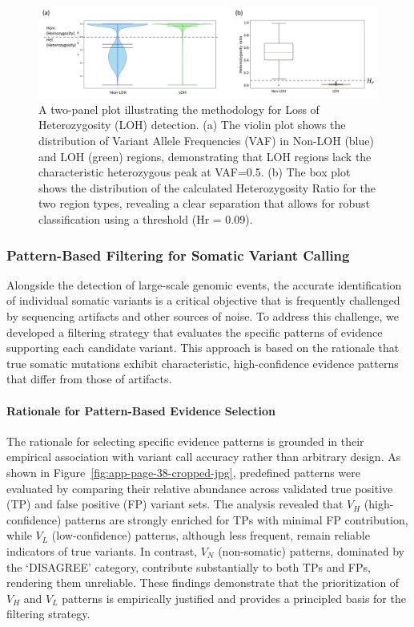 \documentclass[pdflatex,sn-nature]{sn-jnl}
\def\pandocbounded#1{%
  \begingroup
  \setkeys{Gin}{width=1.0\linewidth,height=1.0\textheight,keepaspectratio}%
  #1%
  \endgroup
}
\begin{document}
\begin{figure}
\centering
\pandocbounded{\includegraphics[keepaspectratio]{page_37_cropped.jpg}}
\caption[LOH Detection Methodology]{A two-panel plot illustrating the methodology for Loss of Heterozygosity (LOH) detection. (a) The violin plot shows the distribution of Variant Allele Frequencies (VAF) in Non-LOH (blue) and LOH (green) regions, demonstrating that LOH regions lack the characteristic heterozygous peak at VAF=0.5. (b) The box plot shows the distribution of the calculated Heterozygosity Ratio for the two region types, revealing a clear separation that allows for robust classification using a threshold (Hr = 0.09).}\label{fig:app-page-37-cropped-jpg}
\end{figure}

\subsubsection{Pattern-Based Filtering for Somatic Variant Calling}\label{pattern-based-filtering-for-somatic-variant-calling}

Alongside the detection of large-scale genomic events, the accurate identification of individual somatic variants is a critical objective that is frequently challenged by sequencing artifacts and other sources of noise. To address this challenge, we developed a filtering strategy that evaluates the specific patterns of evidence supporting each candidate variant. This approach is based on the rationale that true somatic mutations exhibit characteristic, high-confidence evidence patterns that differ from those of artifacts.

\paragraph{Rationale for Pattern-Based Evidence Selection}\label{rationale-for-pattern-based-evidence-selection}

The rationale for selecting specific evidence patterns is grounded in their empirical association with variant call accuracy rather than arbitrary design. As shown in Figure~\ref{fig:app-page-38-cropped-jpg}, predefined patterns were evaluated by comparing their relative abundance across validated true positive (TP) and false positive (FP) variant sets. The analysis revealed that \(V_H\) (high-confidence) patterns are strongly enriched for TPs with minimal FP contribution, while \(V_L\) (low-confidence) patterns, although less frequent, remain reliable indicators of true variants. In contrast, \(V_N\) (non-somatic) patterns, dominated by the `DISAGREE' category, contribute substantially to both TPs and FPs, rendering them unreliable. These findings demonstrate that the prioritization of \(V_H\) and \(V_L\) patterns is empirically justified and provides a principled basis for the filtering strategy.
\end{document}
